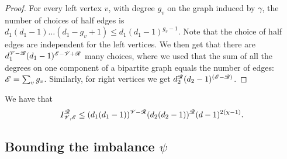 \begin{proof}


For every left vertex $v$, with degree $g_v$ on the graph induced by $\gamma$, 
the number of choices of half edges is $d_1(d_1-1)\dots(d_1- g_v+1)\leq d_1 (d_1-1)^{g_v-1}$. 
Note that the choice of half edges are independent for the left vertices. 
We then get that there are 
$d_1^{\mathscr{V}-\mathscr{R}} (d_1-1)^{\mathscr{E} - \mathscr{V}+\mathscr{R}}$ 
many choices, 
where we used that the sum of all the degrees on one component of a bipartite graph 
equals the number of edges: $\mathscr{E} = \sum_v g_v$. 
Similarly, for right vertices we get 
$d_2^{\mathscr{R}}(d_2-1)^{(\mathscr{E}-\mathscr{R})}$.
\end{proof}

\begin{corollary}
\label{cor:edge_iso}
We have that
\begin{equation}
    I_{\mathscr{V}, \mathscr{E}}^{\mathscr{R}} \leq 
    (d_1 (d_1 - 1))^{\mathscr{V} - \mathscr{R}}
    (d_2 (d_2 - 1))^{\mathscr{R}}
    (d - 1)^{2 (\chi - 1)}.
\end{equation}
\end{corollary}

\subsection{Bounding the imbalance $\psi$}

